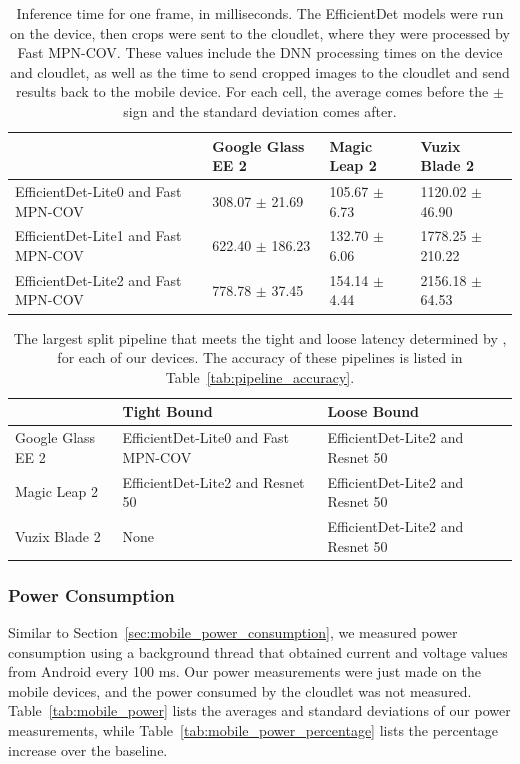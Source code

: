 \begin{table}
\begin{tabular}{|l||l|l|l|}
  \hline
  & Google Glass EE 2 & Magic Leap 2 & Vuzix Blade 2\\
  \hline
  \hline
  EfficientDet-Lite0 and Fast MPN-COV & 308.07 $\pm$ 21.69 & 105.67 $\pm$ 6.73 & 1120.02 $\pm$ 46.90\\
  EfficientDet-Lite1 and Fast MPN-COV & 622.40 $\pm$ 186.23 & 132.70 $\pm$ 6.06 & 1778.25 $\pm$ 210.22\\
  EfficientDet-Lite2 and Fast MPN-COV & 778.78 $\pm$ 37.45 & 154.14 $\pm$ 4.44 & 2156.18 $\pm$ 64.53\\
  \hline
\end{tabular}
  \caption{
    Inference time for one frame, in milliseconds.
    The EfficientDet models were run on the device, then crops were sent to the
    cloudlet, where they were processed by Fast MPN-COV.
    These values include the DNN processing times on the device and cloudlet, as
    well as the time to send cropped images to the cloudlet and send results
    back to the mobile device.
    For each cell, the average comes before the $\pm$ sign and the standard
    deviation comes after.
  }\label{tab:split_time}
\end{table}

\begin{table}
\begin{tabular}{|l||l|l|l|}
  \hline
  & Tight Bound & Loose Bound\\
  \hline
  \hline
  Google Glass EE 2 & EfficientDet-Lite0 and Fast MPN-COV & EfficientDet-Lite2 and Resnet 50\\
  Magic Leap 2 & EfficientDet-Lite2 and Resnet 50 & EfficientDet-Lite2 and Resnet 50\\
  Vuzix Blade 2 & None & EfficientDet-Lite2 and Resnet 50\\
  \hline
\end{tabular}
  \caption{
    The largest split pipeline that meets the tight and loose latency determined
    by \citet{chen2017}, for each of our devices.
    The accuracy of these pipelines is listed in
    Table~\ref{tab:pipeline_accuracy}.
  }\label{tab:split_latency_bound}
\end{table}

\subsubsection{Power Consumption}

Similar to Section~\ref{sec:mobile_power_consumption}, we measured power
consumption using a background thread that obtained current and voltage values
from Android every 100 ms.
Our power measurements were just made on the mobile devices, and the power
consumed by the cloudlet was not measured.
Table~\ref{tab:mobile_power} lists the averages and standard deviations of our
power measurements, while Table~\ref{tab:mobile_power_percentage} lists the
percentage increase over the baseline.

